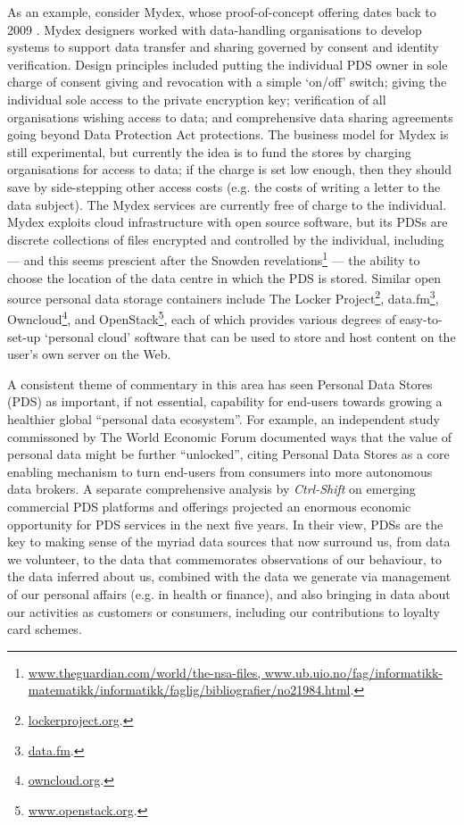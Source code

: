 \documentclass{acm_proc_article-sp}
\begin{document}
As an example, consider Mydex, whose proof-of-concept offering dates back to 2009 \cite{heath2013}. Mydex designers worked with data-handling organisations to develop systems to support data transfer and sharing governed by consent and identity verification. Design principles included putting the individual PDS owner in sole charge of consent giving and revocation with a simple `on/off’ switch; giving the individual sole access to the private encryption key; verification of all organisations wishing access to data; and comprehensive data sharing agreements going beyond Data Protection Act protections. The business model for Mydex is still experimental, but currently the idea is to fund the stores by charging organisations for access to data; if the charge is set low enough, then they should save by side-stepping other access costs (e.g. the costs of writing a letter to the data subject). The Mydex services are currently free of charge to the individual. Mydex exploits cloud infrastructure with open source software, but  its PDSs are discrete collections of files encrypted and controlled by the individual, including --- and this seems prescient after the Snowden revelations\footnote{\url{www.theguardian.com/world/the-nsa-files, www.ub.uio.no/fag/informatikk-matematikk/informatikk/faglig/bibliografier/no21984.html}.} --- the ability to choose the location of the data centre in which the PDS is stored. Similar open source personal data storage containers include The Locker Project\footnote{\url{lockerproject.org}.}, data.fm\footnote{\url{data.fm}.}, Owncloud\footnote{\url{owncloud.org}.}, and OpenStack\footnote{\url{www.openstack.org}.}, each of which provides various degrees of easy-to-set-up `personal cloud’ software that can be used to
store and host content on the user's own server on the Web.


A consistent theme of commentary in this area has seen Personal Data Stores (PDS) as important, if not essential, capability for end-users towards growing a healthier global ``personal data ecosystem''.  For example, an independent study commissoned by The World Economic Forum documented ways that the value of personal data might be further ``unlocked'', citing Personal Data Stores as a core enabling mechanism to turn end-users from consumers into more autonomous data brokers\cite{WEF-report}.  A separate comprehensive analysis by \emph{Ctrl-Shift} on emerging commercial PDS platforms and offerings projected an enormous economic opportunity for PDS services in the next five years\cite{ctrlshift}. In their view, PDSs are the key to making sense of the myriad data sources that now surround us, from data we volunteer, to the data that commemorates observations of our behaviour, to the data inferred about us, combined with the data we generate via management of our personal affairs (e.g. in health or finance), and also bringing in data about our activities as customers or consumers, including our contributions to loyalty card schemes.
\end{document}

